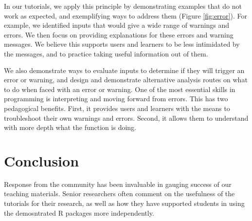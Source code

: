 \documentclass[12pt]{article}
\begin{document}
In our tutorials, we apply this principle by demonstrating examples that do not work as expected, and exemplifying ways to address them (Figure \ref{fig:error}).
For example, we identified inputs that would give a wide range of warnings and errors. We then focus on providing explanations for these errors and warning messages. We believe this supports users and learners to be less intimidated by the messages, and to practice taking useful information out of them.

We also demonstrate ways to evaluate inputs to determine if they will trigger an error or warning, and design and demonstrate alternative analysis routes on what to do when faced with an error or warning.
One of the most essential skills in programming is interpreting and moving forward from errors.
This has two pedagogical benefits. First, it provides users and learners with the means to troubleshoot their own warnings and errors. Second, it allows them to understand with more depth what the function is doing.








\section*{Conclusion}
\label{sec:conclusion}

Response from the community has been invaluable in gauging success of our teaching materials.
Senior researchers often comment on the usefulness of the tutorials for their research, as well as how they have supported students in using the demosntrated R packages more independently.
\end{document}
